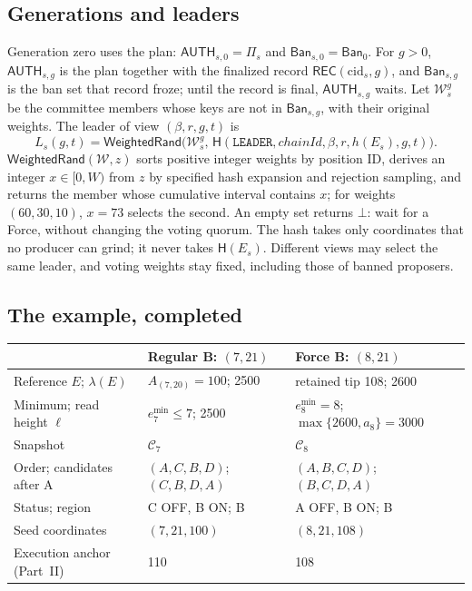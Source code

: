 \documentclass[11pt,a4paper]{article}
\newcommand{\Hash}{\mathsf H}
\newcommand{\tagg}[1]{\mathsf{#1}}
\newcommand{\cfg}{\mathcal C}
\newcommand{\Ban}{\mathsf{Ban}}
\newcommand{\emin}{e^{\min}}
\newcommand{\cid}{\mathrm{cid}}
\begin{document}
\subsection{Generations and leaders}
\label{sec:leaders}
Generation zero uses the plan: $\tagg{AUTH}_{s,0}=\Pi_s$ and
$\Ban_{s,0}=\Ban_0$. For $g>0$, $\tagg{AUTH}_{s,g}$ is the plan together
with the finalized record $\tagg{REC}(\cid_s,g)$, and $\Ban_{s,g}$ is the
ban set that record froze; until the record is final,
$\tagg{AUTH}_{s,g}$ waits. Let $\mathcal W^g_s$ be the committee members
whose keys are not in $\Ban_{s,g}$, with their original weights. The
leader of view $(\beta,r,g,t)$ is
\begin{equation}\label{eq:leader}
 L_s(g,t)=\tagg{WeightedRand}\bigl(\mathcal W^g_s,\,
 \Hash(\texttt{LEADER},\mathit{chainId},\beta,r,h(E_s),g,t)\bigr).
\end{equation}
$\tagg{WeightedRand}(\mathcal W,z)$ sorts positive integer weights by
position ID, derives an integer $x\in[0,W)$ from $z$ by specified hash
expansion and rejection sampling, and returns the member whose cumulative
interval contains $x$; for weights $(60,30,10)$, $x=73$ selects the
second. An empty set returns $\bot$: wait for a Force, without changing
the voting quorum. The hash takes only coordinates that no producer can
grind; it never takes $\Hash(E_s)$. Different views may select the same
leader, and voting weights stay fixed, including those of banned
proposers.

\subsection{The example, completed}
\label{sec:example}
\begin{tabularx}{\linewidth}{@{}>{\raggedright\arraybackslash}p{.27\linewidth}YY@{}}\toprule
 & Regular B: $(7,21)$ & Force B: $(8,21)$\\\midrule
Reference $E$; $\lambda(E)$ & $A_{(7,20)}=100$; 2500 & retained tip 108; 2600\\
Minimum; read height $\ell$ & $\emin_7\le7$; 2500 & $\emin_8=8$; $\max\{2600,a_8\}=3000$\\
Snapshot & $\cfg_7$ & $\cfg_8$\\
Order; candidates after A & $(A,C,B,D)$; $(C,B,D,A)$ & $(A,B,C,D)$; $(B,C,D,A)$\\
Status; region & C OFF, B ON; B & A OFF, B ON; B\\
Seed coordinates & $(7,21,100)$ & $(8,21,108)$\\
Execution anchor (Part~II) & 110 & 108\\\bottomrule
\end{tabularx}
\end{document}
